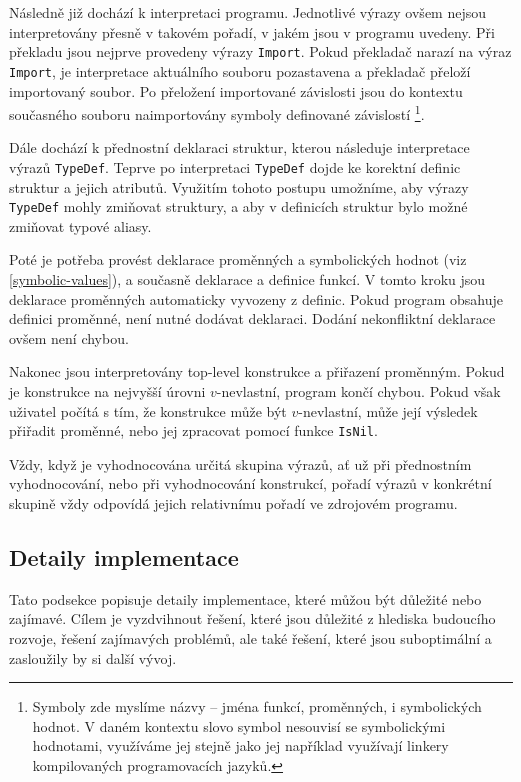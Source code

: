 Následně již dochází k interpretaci programu. Jednotlivé výrazy ovšem nejsou interpretovány přesně
v takovém pořadí, v jakém jsou v programu uvedeny. Při překladu jsou nejprve provedeny výrazy
\lstinline{Import}. Pokud překladač narazí na výraz \lstinline{Import}, je interpretace aktuálního
souboru pozastavena a překladač přeloží importovaný soubor. Po přeložení importované závislosti
jsou do kontextu současného souboru naimportovány symboly definované závislostí \footnote{
  Symboly zde myslíme názvy -- jména funkcí, proměnných, i symbolických hodnot. V daném kontextu
  slovo symbol nesouvisí se symbolickými hodnotami, využíváme jej stejně jako jej například
  využívají linkery kompilovaných programovacích jazyků.
}.

Dále dochází k přednostní deklaraci struktur, kterou následuje interpretace výrazů
\lstinline{TypeDef}. Teprve po interpretaci \lstinline{TypeDef} dojde ke korektní definic struktur
a jejich atributů. Využitím tohoto postupu umožníme, aby výrazy \lstinline{TypeDef} mohly zmiňovat
struktury, a aby v definicích struktur bylo možné zmiňovat typové aliasy.

Poté je potřeba provést deklarace proměnných a symbolických hodnot (viz \ref{symbolic-values}),
a současně deklarace a definice funkcí. V tomto kroku jsou deklarace proměnných automaticky
vyvozeny z definic. Pokud program obsahuje definici proměnné, není nutné dodávat deklaraci. Dodání
nekonfliktní deklarace ovšem není chybou.

Nakonec jsou interpretovány top-level konstrukce a přiřazení proměnným. Pokud je konstrukce
na nejvyšší úrovni $v$-nevlastní, program končí chybou. Pokud však uživatel počítá s tím, že
konstrukce může být $v$-nevlastní, může její výsledek přiřadit proměnné, nebo jej zpracovat
pomocí funkce \lstinline{IsNil}.

Vždy, když je vyhodnocována určitá skupina výrazů, ať už při přednostním vyhodnocování, nebo při
vyhodnocování konstrukcí, pořadí výrazů v konkrétní skupině vždy odpovídá jejich relativnímu pořadí
ve zdrojovém programu.

\subsection{Detaily implementace}

Tato podsekce popisuje detaily implementace, které můžou být důležité nebo zajímavé. Cílem je
vyzdvihnout řešení, které jsou důležité z hlediska budoucího rozvoje, řešení zajímavých problémů,
ale také řešení, které jsou suboptimální a zasloužily by si další vývoj.

